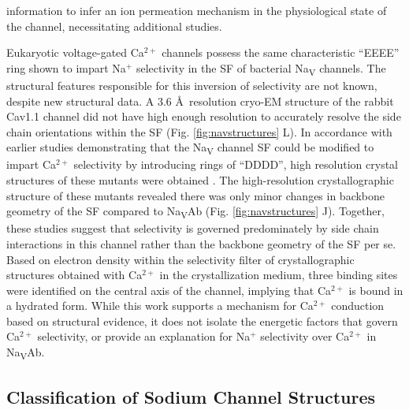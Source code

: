 \begin{refsection}
information to infer an ion permeation mechanism in the physiological state of the channel, necessitating additional studies.

Eukaryotic voltage-gated Ca$^{2+}$ channels possess the same characteristic ``EEEE'' ring shown to impart Na$^+$ selectivity in the SF of bacterial Na\textsubscript{V} channels. The structural features responsible for this inversion of selectivity are not known, despite new structural data. A 3.6 \AA\ resolution cryo-EM structure of the rabbit Cav1.1 channel did not have high enough resolution to accurately resolve the side chain orientations within the SF \cite{Wu:2015bb} (Fig. \ref{fig:navstructures} L). In accordance with earlier studies demonstrating that the Na\textsubscript{V} channel SF could be modified to impart Ca$^{2+}$ selectivity by introducing rings of ``DDDD'', high resolution crystal structures of these mutants were obtained \cite{Tang:2014cn,Catterall:2015dh}. The high-resolution crystallographic structure of these mutants revealed there was only minor changes in backbone geometry of the SF compared to Na\textsubscript{V}Ab (Fig. \ref{fig:navstructures} J).  Together, these studies suggest that selectivity is governed predominately by side chain interactions in this channel rather than the backbone geometry of the SF per se.  Based on electron density within the selectivity filter of crystallographic structures obtained with Ca$^{2+}$ in the crystallization medium, three binding sites were identified on the central axis of the channel, implying that Ca$^{2+}$ is bound in a hydrated form.  While this work supports a mechanism for Ca$^{2+}$ conduction based on structural evidence, it does not isolate the energetic factors that govern Ca$^{2+}$ selectivity, or provide an explanation for Na$^+$ selectivity over Ca$^{2+}$ in Na\textsubscript{V}Ab. 

\subsection{Classification of Sodium Channel Structures}


\end{refsection}
